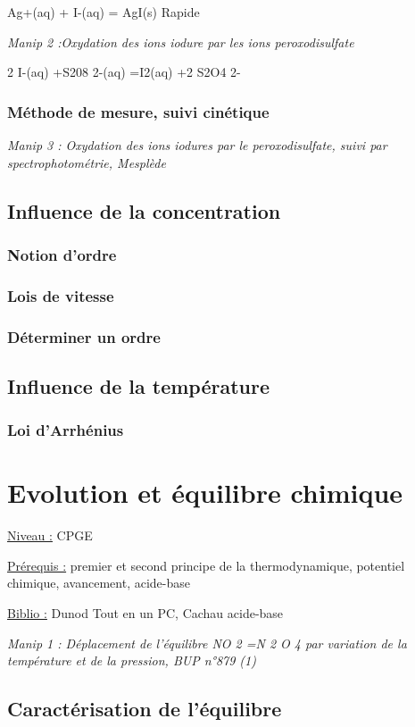 \documentclass{article}%
\begin{document}
Ag+(aq) + I-(aq) = AgI(s)
Rapide

\textit{Manip 2 :Oxydation des ions iodure par les ions peroxodisulfate}

2 I-(aq) +S208 2-(aq) =I2(aq) +2 S2O4 2-

\subsubsection{Méthode de mesure, suivi cinétique}
\textit{Manip 3 : Oxydation des ions iodures par le peroxodisulfate, suivi par spectrophotométrie, Mesplède}
\subsection{Influence de la concentration}
\subsubsection{Notion d'ordre}
\subsubsection{Lois de vitesse}
\subsubsection{Déterminer un ordre}
\subsection{Influence de la température}
\subsubsection{Loi d'Arrhénius}

\section{Evolution et équilibre chimique}
\underline{Niveau :} CPGE 

\underline{Prérequis :} premier et second principe de la thermodynamique, potentiel chimique, avancement, acide-base

\underline{Biblio :} Dunod Tout en un PC, Cachau acide-base

\textit{Manip 1 : Déplacement de l’équilibre NO 2 =N 2 O 4 par variation de la température et de la pression, BUP n°879 (1)}
\subsection{Caractérisation de l’équilibre}
\end{document}
